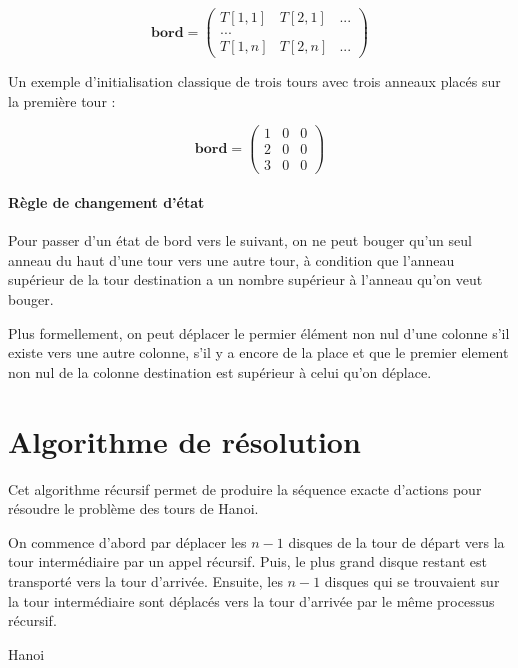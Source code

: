 $$
\mathbf{bord} = 
\begin{pmatrix}
    T[1, 1] & T[2, 1] & ... \\
    ... \\
    T[1, n] & T[2, n] & ...
\end{pmatrix}$$

Un exemple d'initialisation classique de trois tours avec trois anneaux placés sur la première tour :

$$
\mathbf{bord} = 
\begin{pmatrix}
    1 & 0 & 0 \\
    2 & 0 & 0 \\
    3 & 0 & 0 
\end{pmatrix}
$$

\paragraph{Règle de changement d'état}
Pour passer d'un état de bord vers le suivant, on ne peut bouger qu'un seul anneau du haut d'une tour vers une autre tour, à condition que l'anneau supérieur de la tour destination a un nombre supérieur à l'anneau qu'on veut bouger.
\par
Plus formellement, on peut déplacer le permier élément non nul d'une colonne s'il existe vers une autre colonne, s'il y a encore de la place et que le premier element non nul de la colonne destination est supérieur à celui qu'on déplace.

\section{Algorithme de résolution}
Cet algorithme récursif permet de produire la séquence exacte d'actions pour résoudre le problème des tours de Hanoi.
\par
On commence d'abord par déplacer les $n - 1$ disques de la tour de départ vers la tour intermédiaire par un appel récursif. Puis, le plus grand disque restant est transporté vers la tour d'arrivée. Ensuite, les $n - 1$ disques qui se trouvaient sur la tour intermédiaire sont déplacés vers la tour d'arrivée par le même processus récursif.

\begin{algorithm}[H]
    \SetAlgoLined
    \caption{Hanoi}
\end{algorithm}

